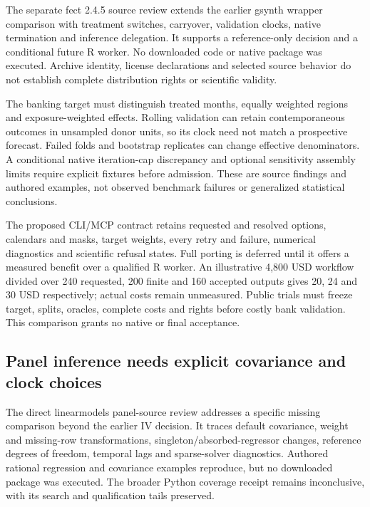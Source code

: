 The separate fect 2.4.5 source review extends the earlier gsynth wrapper
comparison with treatment switches, carryover, validation clocks, native
termination and inference delegation. It supports a reference-only
decision and a conditional future R worker. No downloaded code or native
package was executed. Archive identity, license declarations and
selected source behavior do not establish complete distribution rights
or scientific validity. \citep{exec24_fect_source,exec24_fect_choice}

The banking target must distinguish treated months, equally weighted
regions and exposure-weighted effects. Rolling validation can retain
contemporaneous outcomes in unsampled donor units, so its clock need not
match a prospective forecast. Failed folds and bootstrap replicates can
change effective denominators. A conditional native iteration-cap
discrepancy and optional sensitivity assembly limits require explicit
fixtures before admission. These are source findings and authored
examples, not observed benchmark failures or generalized statistical
conclusions. \citep{exec24_fect_source,exec24_fect_choice}

The proposed CLI/MCP contract retains requested and resolved options,
calendars and masks, target weights, every retry and failure, numerical
diagnostics and scientific refusal states. Full porting is deferred
until it offers a measured benefit over a qualified R worker. An
illustrative 4,800 USD workflow divided over 240 requested, 200 finite
and 160 accepted outputs gives 20, 24 and 30 USD respectively; actual
costs remain unmeasured. Public trials must freeze target, splits,
oracles, complete costs and rights before costly bank validation. This
comparison grants no native or final acceptance.
\citep{exec24_fect_choice}

\hypertarget{panel-inference-needs-explicit-covariance-and-clock-choices}{%
\subsection{Panel inference needs explicit covariance and clock
choices}\label{panel-inference-needs-explicit-covariance-and-clock-choices}}

The direct linearmodels panel-source review addresses a specific missing
comparison beyond the earlier IV decision. It traces default covariance,
weight and missing-row transformations, singleton/absorbed-regressor
changes, reference degrees of freedom, temporal lags and sparse-solver
diagnostics. Authored rational regression and covariance examples
reproduce, but no downloaded package was executed. The broader Python
coverage receipt remains inconclusive, with its search and qualification
tails preserved. \citep{exec24_lmpanel_source,exec24_lmpanel_reference}

